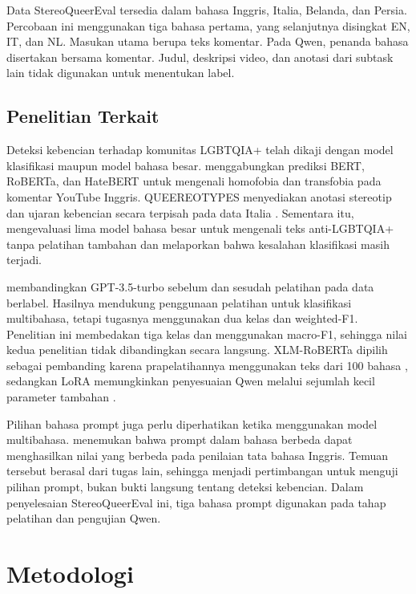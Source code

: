 \documentclass[11pt]{article}
\begin{document}
Data StereoQueerEval tersedia dalam bahasa Inggris, Italia, Belanda, dan Persia. Percobaan ini menggunakan tiga bahasa pertama, yang selanjutnya disingkat EN, IT, dan NL. Masukan utama berupa teks komentar. Pada Qwen, penanda bahasa disertakan bersama komentar. Judul, deskripsi video, dan anotasi dari subtask lain tidak digunakan untuk menentukan label.

\subsection{Penelitian Terkait}
Deteksi kebencian terhadap komunitas LGBTQIA+ telah dikaji dengan model klasifikasi maupun model bahasa besar. \citet{nozza-2022-nozza} menggabungkan prediksi BERT, RoBERTa, dan HateBERT untuk mengenali homofobia dan transfobia pada komentar YouTube Inggris. QUEEREOTYPES menyediakan anotasi stereotip dan ujaran kebencian secara terpisah pada data Italia \citep{cignarella-etal-2024-queereotypes}. Sementara itu, \citet{nguyen-etal-2025-leveraging} mengevaluasi lima model bahasa besar untuk mengenali teks anti-LGBTQIA+ tanpa pelatihan tambahan dan melaporkan bahwa kesalahan klasifikasi masih terjadi.

\citet{chan-etal-2024-hate} membandingkan GPT-3.5-turbo sebelum dan sesudah pelatihan pada data berlabel. Hasilnya mendukung penggunaan pelatihan untuk klasifikasi multibahasa, tetapi tugasnya menggunakan dua kelas dan weighted-F1. Penelitian ini membedakan tiga kelas dan menggunakan macro-F1, sehingga nilai kedua penelitian tidak dibandingkan secara langsung. XLM-RoBERTa dipilih sebagai pembanding karena prapelatihannya menggunakan teks dari 100 bahasa \citep{conneau-etal-2020-unsupervised}, sedangkan LoRA memungkinkan penyesuaian Qwen melalui sejumlah kecil parameter tambahan \citep{hu-etal-2021-lora}.

Pilihan bahasa prompt juga perlu diperhatikan ketika menggunakan model multibahasa. \citet{behzad-etal-2024-ask} menemukan bahwa prompt dalam bahasa berbeda dapat menghasilkan nilai yang berbeda pada penilaian tata bahasa Inggris. Temuan tersebut berasal dari tugas lain, sehingga menjadi pertimbangan untuk menguji pilihan prompt, bukan bukti langsung tentang deteksi kebencian. Dalam penyelesaian StereoQueerEval ini, tiga bahasa prompt digunakan pada tahap pelatihan dan pengujian Qwen.

\section{Metodologi}
\end{document}
